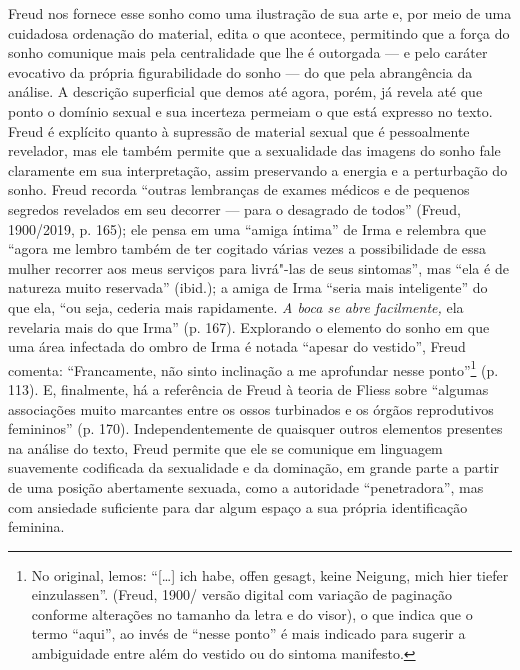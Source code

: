 Freud nos fornece esse sonho como uma ilustração de sua arte e, por meio
de uma cuidadosa ordenação do material, edita o que acontece, permitindo
que a força do sonho comunique mais pela centralidade que lhe é
outorgada --- e pelo caráter evocativo da própria figurabilidade do sonho
--- do que pela abrangência da análise. A descrição superficial que demos
até agora, porém, já revela até que ponto o domínio sexual e sua
incerteza permeiam o que está expresso no texto. Freud é explícito
quanto à supressão de material sexual que é pessoalmente revelador, mas
ele também permite que a sexualidade das imagens do sonho fale
claramente em sua interpretação, assim preservando a energia e a
perturbação do sonho. Freud recorda ``outras lembranças de exames
médicos e de pequenos segredos revelados em seu decorrer --- para o
desagrado de todos'' (Freud, 1900/2019, p. 165); ele pensa em uma
``amiga íntima'' de Irma e relembra que ``agora me lembro também de ter
cogitado várias vezes a possibilidade de essa mulher recorrer aos meus
serviços para livrá"-las de seus sintomas'', mas ``ela é de natureza
muito reservada'' (ibid.); a amiga de Irma ``seria mais inteligente'' do
que ela, ``ou seja, cederia mais rapidamente. \emph{A boca se abre
facilmente,} ela revelaria mais do que Irma'' (p. 167). Explorando o
elemento do sonho em que uma área infectada do ombro de Irma é notada
``apesar do vestido'', Freud comenta: ``Francamente, não sinto
inclinação a me aprofundar nesse ponto''\footnote{No original, lemos:
  ``{[}\ldots{}{]} ich habe, offen gesagt, keine Neigung, mich hier
  tiefer einzulassen''. (Freud, 1900/ versão digital com variação de
  paginação conforme alterações no tamanho da letra e do visor), o que
  indica que o termo ``aqui'', ao invés de ``nesse ponto'' é mais
  indicado para sugerir a ambiguidade entre além do vestido ou do
  sintoma manifesto.} (p. 113). E, finalmente, há a referência de Freud
à teoria de Fliess sobre ``algumas associações muito marcantes entre os
ossos turbinados e os órgãos reprodutivos femininos'' (p. 170).
Independentemente de quaisquer outros elementos presentes na análise do
texto, Freud permite que ele se comunique em linguagem suavemente
codificada da sexualidade e da dominação, em grande parte a partir de
uma posição abertamente sexuada, como a autoridade ``penetradora'', mas
com ansiedade suficiente para dar algum espaço a sua própria
identificação feminina.

